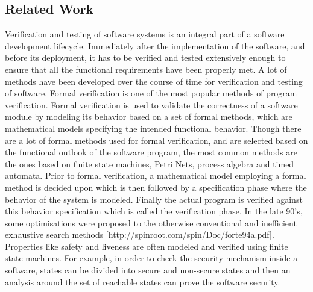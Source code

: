 

\subsection{Related Work}

Verification and testing of software systems is an integral part of a software development lifecycle. Immediately after the implementation of the software, and before its deployment, it has to be verified and tested extensively enough to ensure that all the functional requirements have been properly met. A lot of methods have been developed over the course of time for verification and testing of software. Formal verification is one of the most popular methods of program verification. Formal verification is used to validate the correctness of a software module by modeling its behavior based on a set of formal methods, which are mathematical models specifying the intended functional behavior. Though there are a lot of formal methods used for formal verification, and are selected based on the functional outlook of the software program, the most common methods are the ones based on finite state machines, Petri Nets, process algebra and timed automata. Prior to formal verification, a mathematical model employing a formal method is decided upon which is then followed by a specification phase where the behavior of the system is modeled. Finally the actual program is verified against this behavior specification which is called the verification phase. In the late 90's, some optimisations were proposed to the otherwise conventional and inefficient exhaustive search methods [http://spinroot.com/spin/Doc/forte94a.pdf]. Properties like safety and liveness are often modeled and verified using finite state machines. For example, in order to check the security mechanism inside a software, states can be divided into secure and non-secure states and then an analysis around the set of reachable states can prove the software security.


